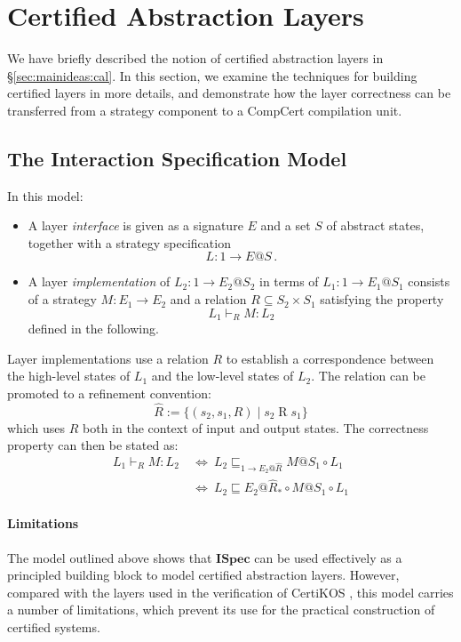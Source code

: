 \documentclass[sigplan,10pt,authordraft]{acmart}
\newcommand{\ISpec}{\mathbf{ISpec}}
\begin{document}
\section{Certified Abstraction Layers} \label{sec:cal}

We have briefly described
the notion of certified abstraction layers
in \S\ref{sec:mainideas:cal}.
In this section, we examine the techniques
for building certified layers in more details,
and demonstrate how the layer correctness
can be transferred from a strategy component
to a CompCert compilation unit.

\subsection{The Interaction Specification Model} %

In this model:
\begin{itemize}
  \item
    A layer \emph{interface} is given as
    a signature $E$ and
    a set $S$ of abstract states,
    together with a strategy specification
    \[ L : 1 \rightarrow E@S \,. \]
  \item
    A layer \emph{implementation}
    of $L_2 : 1 \rightarrow E_2@S_2$
    in terms of $L_1 : 1 \rightarrow E_1@S_1$
    consists of
    a strategy $M : E_1 \rightarrow E_2$ and
    a relation $R \subseteq S_2 \times S_1$
    satisfying the property
    \[ L_1 \vdash_R M : L_2 \]
    defined in the following.
\end{itemize}

Layer implementations use a relation $R$
to establish a correspondence between
the high-level states of $L_1$ and
the low-level states of $L_2$.
The relation can be promoted to a refinement convention:
\[
  \hat{R} := \{ (s_2, s_1, R) \mid s_2 \mathrel{R} s_1 \}
\]
which uses $R$ both in the context of
input and output states.
The correctness property can then be stated as:
\begin{align*}
  L_1 \vdash_R M : L_2 \:&\Leftrightarrow\:
  L_2 \sqsubseteq_{1 \rightarrow E_2@\hat{R}} M@S_1 \circ L_1
  \\ &\Leftrightarrow\:
  L_2 \sqsubseteq E_2@\hat{R}_* \circ M@S_1 \circ L_1
\end{align*}

\paragraph{Limitations} %

The model outlined above
shows that $\ISpec$ can be used effectively
as a principled building block to model
certified abstraction layers.
However,
compared with the layers used in the verification of CertiKOS \cite{popl15},
this model carries a number of limitations,
which prevent its use for the practical construction
of certified systems.
\end{document}
